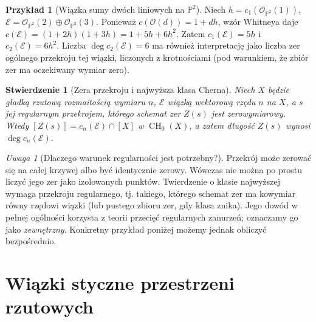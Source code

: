 \documentclass[11pt,a4paper,openany]{report}
\numberwithin{equation}{section}
\theoremstyle{plain}
\newtheorem{stwierdzenie}[twierdzenie]{Stwierdzenie}
\theoremstyle{definition}
\newtheorem{przyklad}[twierdzenie]{Przykład}
\theoremstyle{remark}
\newtheorem{uwaga}[twierdzenie]{Uwaga}
\newcommand{\PP}{\mathbb P}
\begin{document}
\begin{przyklad}[Wiązka sumy dwóch liniowych na $\PP^2$]
\label{prz:ga7-chern-sum}
Niech $h=c_1(\mathcal O_{\PP^2}(1))$,
$\mathcal E=\mathcal O_{\PP^2}(2)\oplus\mathcal O_{\PP^2}(3)$.
Ponieważ $c(\mathcal O(d))=1+dh$, wzór Whitneya daje
$c(\mathcal E)=(1+2h)(1+3h)=1+5h+6h^2$.
Zatem $c_1(\mathcal E)=5h$ i $c_2(\mathcal E)=6h^2$.
Liczba $\deg c_2(\mathcal E)=6$ ma również
interpretację jako liczba zer ogólnego przekroju
tej wiązki, liczonych z krotnościami (pod warunkiem,
że zbiór zer ma oczekiwany wymiar zero).
\end{przyklad}

\begin{stwierdzenie}[Zera przekroju i najwyższa klasa Cherna]
\label{st:ga7-zero-section}
Niech $X$ będzie gładką rzutową rozmaitością wymiaru $n$,
$\mathcal E$ wiązką wektorową rzędu $n$ na $X$,
a $s$ jej regularnym przekrojem, którego schemat zer
$Z(s)$ jest zerowymiarowy. Wtedy
$[Z(s)]=c_n(\mathcal E)\cap[X]$ w $\operatorname{CH}_0(X)$,
a zatem długość $Z(s)$ wynosi $\deg c_n(\mathcal E)$.
\end{stwierdzenie}
\begin{uwaga}[Dlaczego warunek regularności jest potrzebny?]
Przekrój może zerować się na całej krzywej albo
być identycznie zerowy. Wówczas nie można po prostu
liczyć jego zer jako izolowanych punktów. Twierdzenie
o klasie najwyższej wymaga przekroju regularnego,
tj. takiego, którego schemat zer ma kowymiar równy
rzędowi wiązki (lub pustego zbioru zer, gdy klasa znika).
Jego dowód w pełnej ogólności korzysta z teorii
przecięć regularnych zanurzeń; oznaczamy go jako
\emph{zewnętrzny}. Konkretny przykład poniżej
możemy jednak obliczyć bezpośrednio.
\end{uwaga}

\section{Wiązki styczne przestrzeni rzutowych}
\label{sec:ga7-tangent}
\end{document}
